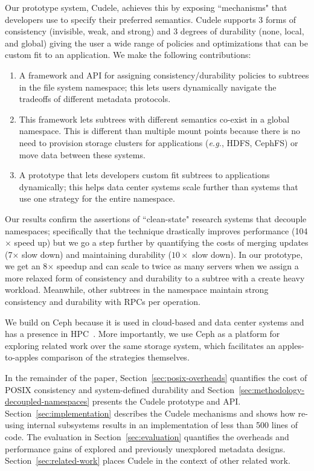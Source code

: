 Our prototype system, Cudele, achieves this by exposing ``mechanisms" that
developers use to specify their preferred semantics.  Cudele supports 3 forms
of consistency (invisible, weak, and strong) and 3 degrees of durability (none,
local, and global) giving the user a wide range of policies and optimizations
that can be custom fit to an application. We make the following contributions:

\begin{enumerate}

  \item A framework and API for assigning consistency/durability policies 
  to subtrees in the file system namespace; this lets users dynamically navigate
  the tradeoffs of different metadata protocols.

  \item This framework lets subtrees with different semantics co-exist in a
  global namespace. This is different than multiple mount points because
  there is no need to provision storage clusters for applications
  ({\it e.g.}, HDFS, CephFS) or move data between these systems.

  \item A prototype that lets developers custom fit subtrees to applications
  dynamically; this helps data center systems scale further than systems that
  use one strategy for the entire namespace.

\end{enumerate}

Our results confirm the assertions of ``clean-state" research systems that
decouple namespaces; specifically that the technique drastically improves
performance (104\(\times\) speed up) but we go a step further by quantifying
the costs of merging updates (7\(\times\) slow down) and maintaining durability
(\(10\times\) slow down). In our prototype, we get an 8\(\times\) speedup and
can scale to twice as many servers when we assign a more relaxed form of
consistency and durability to a subtree with a create heavy workload.
Meanwhile, other subtrees in the namespace maintain strong consistency and
durability with RPCs per operation.

We build on Ceph because it is used in cloud-based and data center
systems and has a presence in HPC~\cite{}.  More importantly,  we use Ceph as a
platform for exploring related work over the same storage system, which
facilitates an apples-to-apples comparison of the strategies themselves.  

In the remainder of the paper, Section~\ref{sec:posix-overheads} quantifies the
cost of POSIX consistency and system-defined durability and
Section~\ref{sec:methodology-decoupled-namespaces} presents the Cudele
prototype and API. Section~\ref{sec:implementation} describes the Cudele
mechanisms and shows how re-using internal subsystems results in an
implementation of less than 500 lines of code. The evaluation in
Section~\ref{sec:evaluation} quantifies the overheads and performance gains of
explored and previously unexplored metadata designs.
Section~\ref{sec:related-work} places Cudele in the context of other related
work.

